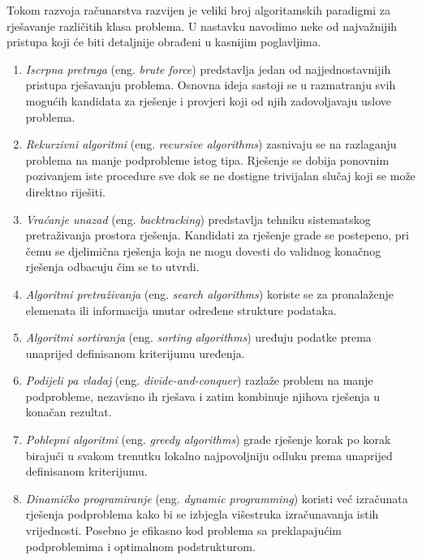 Tokom razvoja računarstva razvijen je veliki broj algoritamskih paradigmi za rješavanje različitih klasa problema. U nastavku navodimo neke od najvažnijih pristupa koji će biti detaljnije obrađeni u kasnijim poglavljima.

\begin{enumerate}
	\item \textit{Iscrpna pretraga} (eng. \emph{brute force}) predstavlja jedan od najjednostavnijih pristupa rješavanju problema. Osnovna ideja sastoji se u razmatranju svih mogućih kandidata za rješenje i provjeri koji od njih zadovoljavaju uslove problema.
	
	\item \textit{Rekurzivni algoritmi} (eng. \textit{recursive algorithms}) zasnivaju se na razlaganju problema na manje podprobleme istog tipa. Rješenje se dobija ponovnim pozivanjem iste procedure sve dok se ne dostigne trivijalan slučaj koji se može direktno riješiti.
	
	\item \textit{Vraćanje unazad} (eng. \emph{backtracking}) predstavlja tehniku sistematskog pretraživanja prostora rješenja. Kandidati za rješenje grade se postepeno, pri čemu se djelimična rješenja koja ne mogu dovesti do validnog konačnog rješenja odbacuju čim se to utvrdi.
	
	\item \textit{Algoritmi pretraživanja} (eng. \textit{search algorithms}) koriste se za pronalaženje elemenata ili informacija unutar određene strukture podataka.
	
	\item \textit{Algoritmi sortiranja} (eng. \textit{sorting algorithms}) uređuju podatke prema unaprijed definisanom kriterijumu uređenja.
	
	\item \textit{Podijeli pa vladaj} (eng. \emph{divide-and-conquer}) razlaže problem na manje podprobleme, nezavisno ih rješava i zatim kombinuje njihova rješenja u konačan rezultat.
	
	\item \textit{Pohlepni algoritmi} (eng. \textit{greedy algorithms}) grade rješenje korak po korak birajući u svakom trenutku lokalno najpovoljniju odluku prema unaprijed definisanom kriterijumu.
	
	\item \textit{Dinamičko programiranje} (eng. \textit{dynamic programming}) koristi već izračunata rješenja podproblema kako bi se izbjegla višestruka izračunavanja istih vrijednosti. Posebno je efikasno kod problema sa preklapajućim podproblemima i optimalnom podstrukturom.
\end{enumerate}

